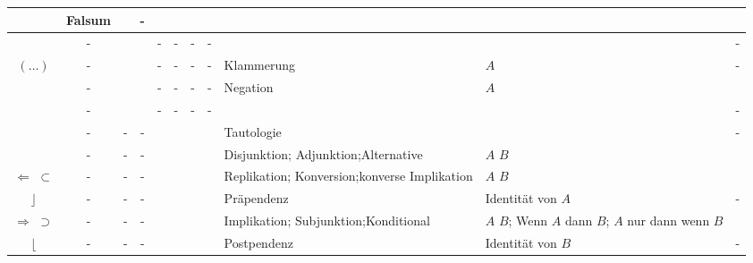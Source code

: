 {\begin{table}[p]
\begin{threeparttable}
\begin{tabularx}{\linewidth}{|c||c:cc:cccc|X:X|c|}
			& Falsum
			&  & - \\
			\hline\hline%
			& - & \texttrue & \texttrue  & - & - & - & - & & & - \\
			\tableline%
			$(\dots)$
			& - & \texttrue & \textfalse & - & - & - & -
			& Klammerung
			& $A$  & - \\
			\tableline%
			& - & \textfalse & \texttrue  & - & - & - & -
			& Negation
			&  $A$ & \thepnot{} \\
			\tableline%
			& - & \textfalse & \textfalse & - & - & - & - & & & -  \\
			\hline\hline%
			& - & - & - &\texttrue&\texttrue&\texttrue&\texttrue
			& Tautologie
			& & - \\
			\tableline%
			\defSym{\OjkOr}
			& - & - & - &\texttrue&\texttrue&\texttrue&\textfalse
			& Disjunktion; Adjunktion;\newline Alternative
			& $A$  $B$ & \thepor \\
			\tableline%
			 $\Leftarrow$ $\subset$
			& - & - & - &\texttrue&\texttrue&\textfalse&\texttrue
			& Replikation; Konversion;\newline konverse Implikation
			& $A$  $B$ & \theprep \\
			\tableline%
			$\rfloor$
			& - & - & - &\texttrue&\texttrue&\textfalse&\textfalse
			& Präpendenz
			& Identität von $A$ & - \\
			\tablegroup%
			 $\Rightarrow$ $\supset$
			& - & - & - &\texttrue&\textfalse&\texttrue&\texttrue
			& Implikation; Subjunktion;\newline Konditional
			&  $A$  $B$; Wenn $A$ dann $B$;\newline
			$A$ nur dann wenn $B$ & \thepimp \\
			\tableline%
			$\lfloor$
			& - & - & - &\texttrue&\textfalse&\texttrue&\textfalse
			& Postpendenz
			& Identität von $B$ & - \\

\end{tabularx}
\end{threeparttable}
\end{table}}
